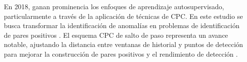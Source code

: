 En 2018, ganan prominencia los enfoques de aprendizaje autosupervisado, particularmente a través de la aplicación de técnicas de CPC. En este estudio se busca transformar la identificación de anomalías en problemas de identificación de pares positivos \cite{noauthor_180703748_nodate}. El esquema CPC de salto de paso representa un avance notable, ajustando la distancia entre ventanas de historial y puntos de detección para mejorar la construcción de pares positivos y el rendimiento de detección \cite{zhang_skip-step_2024}.